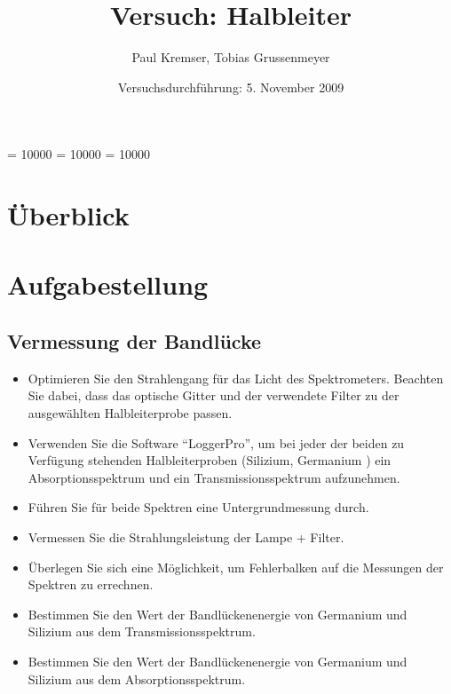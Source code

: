 \documentclass[12pt]{article}
\newcommand{\changefont}[3]{
\fontfamily{#1} \fontseries{#2} \fontshape{#3} \selectfont}
\begin{document}
\clubpenalty = 10000
\widowpenalty = 10000 
\displaywidowpenalty = 10000

\onehalfspacing
\changefont{ptm}{m}{n} 

\begin{titlepage}
\author{Paul Kremser, Tobias Grussenmeyer}
\title{Versuch: Halbleiter}
\date{Versuchsdurchführung: 5. November 2009} 
\maketitle
\thispagestyle{empty}
\end{titlepage}


\tableofcontents
\thispagestyle{empty}
\newpage
{}
\section{Überblick}

\section{Aufgabestellung}
\subsection{Vermessung der Bandlücke}
\begin{itemize}
 \item Optimieren Sie den Strahlengang für das Licht des Spektrometers. Beachten
Sie dabei, dass das optische Gitter und der verwendete Filter zu der
ausgewählten Halbleiterprobe passen.
 \item Verwenden Sie die Software “LoggerPro”, um bei jeder der beiden zu
Verfügung stehenden Halbleiterproben (Silizium, Germanium ) ein
Absorptionsspektrum und ein Transmissionsspektrum aufzunehmen.
 \item Führen Sie für beide Spektren eine Untergrundmessung durch.
 \item Vermessen Sie die Strahlungsleistung der Lampe + Filter.
 \item Überlegen Sie sich eine Möglichkeit, um Fehlerbalken auf die Messungen der
Spektren zu errechnen.
 \item Bestimmen Sie den Wert der Bandlückenenergie von Germanium und
Silizium aus dem Transmissionsspektrum.
 \item Bestimmen Sie den Wert der Bandlückenenergie von Germanium und
Silizium aus dem Absorptionsspektrum.
\end{itemize}
\end{document}

